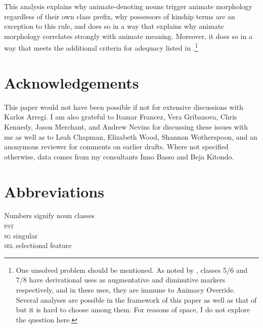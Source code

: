 \documentclass[output=paper
,newtxmath
,modfonts
,nonflat]{langsci/langscibook}
\begin{document}
This analysis explains why animate-denoting nouns trigger animate morphology regardless of their own class prefix, why possessors of kinship terms are an exception to this rule, and does so in a way that explains why animate morphology correlates strongly with animate meaning. Moreover, it does so in a way that meets the additional criteria for adequacy listed in .\footnote{One unsolved problem should be mentioned.  As noted by \citet{carstens91}, classes 5/6 and 7/8 have derivational uses as augmentative and diminutive markers respectively, and in these uses, they are immune to Animacy Override.  Several analyses are possible in the framework of this paper as well as that of \citet{carstens91} but it is hard to choose among them.  For reasons of space, I do not explore the question here.}

 
 
 \section*{Acknowledgements} \label{sec:pesetsky:acknowledgements}

This paper would not have been possible if not for extensive discussions with Karlos Arregi. I am also grateful to Itamar Francez, Vera Gribanova, Chris Kennedy, Jason Merchant, and Andrew Nevins for discussing these issues with me as well as to Leah Chapman, Elizabeth Wood, Shannon Wotherspoon, and an anonymous reviewer for comments on earlier drafts.  Where not specified otherwise, data comes from my consultants Inno Basso and Beja Kitondo.

\section*{Abbreviations} \label{sec:pesetsky:abbreviations}



\noindent Numbers signify noun classes \\ \noindent \textsc{pst} \hspace{3ex}  \\ \noindent \textsc{sg} \hspace{4ex} singular \\ \noindent  \textsc{sel} \hspace{3ex} selectional feature \\ \noindent \printbibliography[heading=subbibliography,notkeyword=this]





            



            

  
 
\end{document}
